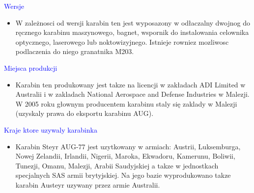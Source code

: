 \documentclass[landscape]{slides}
\begin{document}
\begin{slide}
\centering
\textcolor{blue}{\Large{Wersje}}
\begin{itemize}
\item 
{W zależnosci od wersji karabin ten jest wyposazony w odłaczalny dwojnog do ręcznego karabinu maszynowego, bagnet, wspornik do instalowania celownika optycznego, laserowego lub noktowizyjnego. Istnieje rowniez mozliwosc podlaczenia do niego granatnika M203.}
\end{itemize}
\end{slide}

\begin{slide}
\centering
\textcolor{blue}{\Large{Miejsca produkcji}}
\begin{itemize}
\item 
{Karabin ten produkowany jest takze na licencji w zakładach ADI Limited w Australii i w zakladach National Aerospace and Defense Industries w Malezji. W 2005 roku głownym producentem karabinu staly się zaklady w Malezji (uzyskaly prawa do eksportu karabinu AUG).}
\end{itemize}
\end{slide}

\begin{slide}
\centering
\textcolor{blue}{\Large{Kraje ktore uzywaly karabinka}}
\begin{itemize}
\item 
{Karabin Steyr AUG-77 jest uzytkowany w armiach: Austrii, Luksemburga, Nowej Zelandii, Irlandii, Nigerii, Maroka, Ekwadoru, Kamerunu, Boliwii, Tunezji, Omanu, Malezji, Arabii Saudyjskiej a takze w jednostkach specjalnych SAS armii brytyjskiej. Na jego bazie wyprodukowano takze karabin Austeyr uzywany przez armie Australii.}
\end{itemize}
\end{slide}
\end{document}
